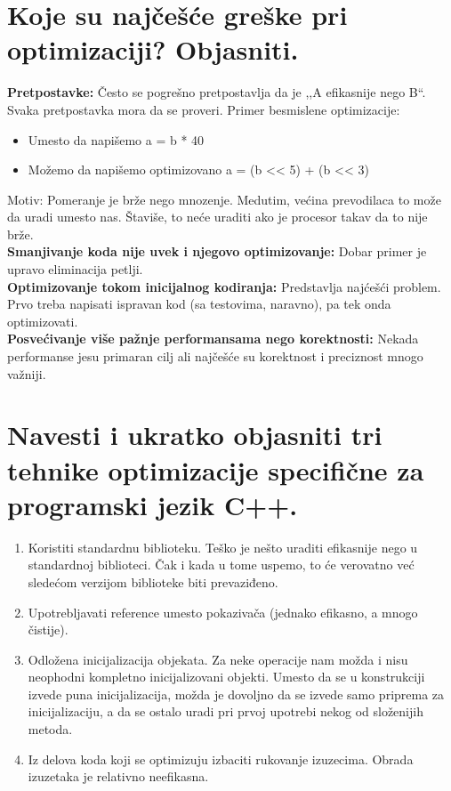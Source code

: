 \documentclass[a4paper]{article}
\begin{document}
\section{Koje su najčešće greške pri optimizaciji? Objasniti.}
  \textbf{Pretpostavke:} Često se pogrešno pretpostavlja da je ,,A efikasnije nego B``. 
  Svaka pretpostavka mora da se proveri. Primer besmislene optimizacije:
  \begin{itemize}
    \item Umesto da napišemo a = b * 40
    \item Možemo da napišemo optimizovano a = (b << 5) + (b << 3)
  \end{itemize}
  Motiv: Pomeranje je brže nego mnozenje. Medutim, većina prevodilaca to može da uradi umesto nas.
  Štaviše, to neće uraditi ako je procesor takav da to nije brže.\\
  
  \textbf{Smanjivanje koda nije uvek i njegovo optimizovanje:} Dobar primer je upravo 
  eliminacija petlji. \\
  
  \textbf{Optimizovanje tokom inicijalnog kodiranja:} Predstavlja najćešći problem. 
  Prvo treba napisati ispravan kod (sa testovima, naravno), pa tek onda optimizovati.\\
  
  \textbf{Posvećivanje više pažnje performansama nego korektnosti:} Nekada performanse jesu 
  primaran cilj ali najčešće su korektnost i preciznost mnogo važniji.
  
\section{Navesti i ukratko objasniti tri tehnike optimizacije specifične za programski jezik C++.}
  \begin{enumerate}
    \item Koristiti standardnu biblioteku. Teško je nešto uraditi efikasnije nego u standardnoj 
          biblioteci. Čak i kada u tome uspemo, to će verovatno već sledećom verzijom biblioteke 
          biti prevaziđeno.
    \item Upotrebljavati reference umesto pokazivača (jednako efikasno, a mnogo čistije).
    \item Odložena inicijalizacija objekata. Za neke operacije nam možda i nisu neophodni kompletno 
          inicijalizovani objekti. Umesto da se u konstrukciji izvede puna inicijalizacija, 
          možda je dovoljno da se izvede samo priprema za inicijalizaciju, a da se ostalo uradi pri 
          prvoj upotrebi nekog od složenijih metoda.
    \item Iz delova koda koji se optimizuju izbaciti rukovanje izuzecima. Obrada izuzetaka je 
          relativno neefikasna.
  \end{enumerate}
\end{document}

